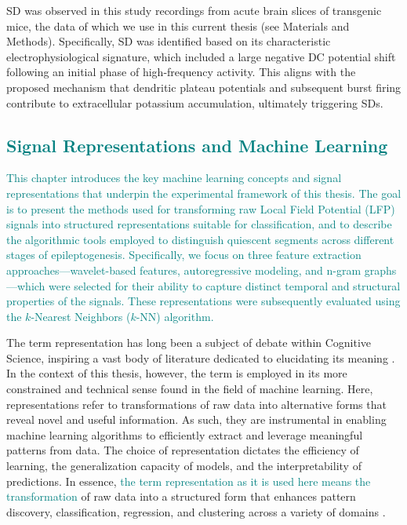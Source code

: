 \documentclass{article}
\begin{document}
SD was observed in this study \cite{vasilopoulos2023} recordings from acute brain slices of transgenic mice, the data of which we use in this current thesis (see Materials and Methods). Specifically, SD was identified based on its characteristic electrophysiological signature, which included a large negative DC potential shift following an initial phase of high-frequency activity. This aligns with the proposed mechanism that dendritic plateau potentials and subsequent burst firing contribute to extracellular potassium accumulation, ultimately triggering SDs.

\subsection{\textcolor{teal}{Signal Representations and Machine Learning}}

\textcolor{teal}{This chapter introduces the key machine learning concepts and signal representations that underpin the experimental framework of this thesis. The goal is to present the methods used for transforming raw Local Field Potential (LFP) signals into structured representations suitable for classification, and to describe the algorithmic tools employed to distinguish quiescent segments across different stages of epileptogenesis. Specifically, we focus on three feature extraction approaches—wavelet-based features, autoregressive modeling, and n-gram graphs—which were selected for their ability to capture distinct temporal and structural properties of the signals. These representations were subsequently evaluated using the $k$-Nearest Neighbors ($k$-NN) algorithm.}

The term representation has long been a subject of debate within Cognitive Science, inspiring a vast body of literature dedicated to elucidating its meaning \cite{shea2018}. In the context of this thesis, however, the term is employed in its more constrained and technical sense found in the field of machine learning. Here, representations refer to transformations of raw data into alternative forms that reveal novel and useful information. As such, they are instrumental in enabling machine learning algorithms to efficiently extract and leverage meaningful patterns from data. The choice of representation dictates the efficiency of learning, the generalization capacity of models, and the interpretability of predictions. In essence, \textcolor{teal}{the term representation as it is used here means the transformation} of raw data into a structured form that enhances pattern discovery, classification, regression, and clustering across a variety of domains \cite{bengio2013}.
\end{document}
